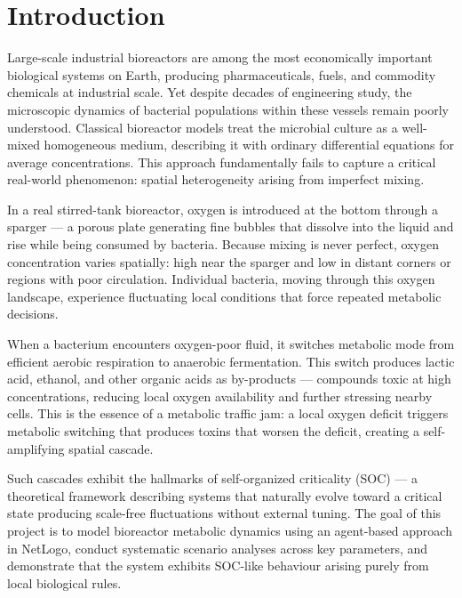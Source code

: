 \documentclass[12pt]{article}
\begin{document}
\vspace{8pt}

\section{Introduction}

Large-scale industrial bioreactors are among the most economically important biological systems on Earth, producing pharmaceuticals, fuels, and commodity chemicals at industrial scale. Yet despite decades of engineering study, the microscopic dynamics of bacterial populations within these vessels remain poorly understood. Classical bioreactor models treat the microbial culture as a well-mixed homogeneous medium, describing it with ordinary differential equations for average concentrations. This approach fundamentally fails to capture a critical real-world phenomenon: spatial heterogeneity arising from imperfect mixing.

In a real stirred-tank bioreactor, oxygen is introduced at the bottom through a sparger --- a porous plate generating fine bubbles that dissolve into the liquid and rise while being consumed by bacteria. Because mixing is never perfect, oxygen concentration varies spatially: high near the sparger and low in distant corners or regions with poor circulation. Individual bacteria, moving through this oxygen landscape, experience fluctuating local conditions that force repeated metabolic decisions.

When a bacterium encounters oxygen-poor fluid, it switches metabolic mode from efficient aerobic respiration to anaerobic fermentation. This switch produces lactic acid, ethanol, and other organic acids as by-products --- compounds toxic at high concentrations, reducing local oxygen availability and further stressing nearby cells. This is the essence of a metabolic traffic jam: a local oxygen deficit triggers metabolic switching that produces toxins that worsen the deficit, creating a self-amplifying spatial cascade.

Such cascades exhibit the hallmarks of self-organized criticality (SOC) --- a theoretical framework describing systems that naturally evolve toward a critical state producing scale-free fluctuations without external tuning. The goal of this project is to model bioreactor metabolic dynamics using an agent-based approach in NetLogo, conduct systematic scenario analyses across key parameters, and demonstrate that the system exhibits SOC-like behaviour arising purely from local biological rules.
\end{document}
